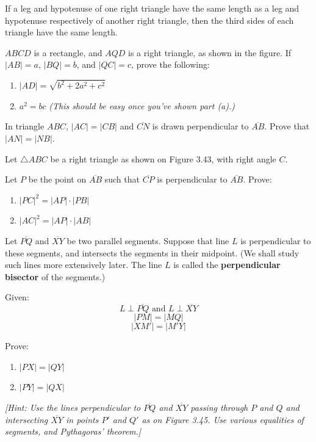 \documentclass[12pt]{book} %
\begin{document}
\begin{ExerciseList}
If a leg and hypotenuse of one right triangle have the same length as a leg and hypotenuse respectively of another right triangle, then the third sides of each triangle have the same length.

\Exercise $ABCD$ is a rectangle, and $AQD$ is a right triangle, as shown in the figure. If $|AB|=a$, $|BQ|=b$, and $|QC|=c$, prove the following:
\begin{enumerate}
\item[(a)] $|AD|=\sqrt{b^2+2a^2+c^2}$
\item[(b)] $a^2=bc$ \textit{(This should be easy once you've shown part (a).)}
\end{enumerate}


\Exercise In triangle $ABC$, $|AC|=|CB|$ and $\overline{CN}$ is drawn perpendicular to $\overline{AB}$. Prove that $|AN|=|NB|$.


\Exercise Let $\triangle ABC$ be a right triangle as shown on Figure 3.43, with right angle $C$.


Let $P$ be the point on $\overline{AB}$ such that $\overline{CP}$ is perpendicular to $\overline{AB}$. Prove:
\begin{enumerate}
\item[(a)] $|PC|^2=|AP|\cdot|PB|$
\item[(b)] $|AC|^2=|AP|\cdot|AB|$
\end{enumerate}

\Exercise Let $\overline{PQ}$ and $\overline{XY}$ be two parallel segments. Suppose that line $L$ is perpendicular to these segments, and intersects the segments in their midpoint. (We shall study such lines more extensively later. The line $L$ is called the \textbf{perpendicular bisector} of the segments.)

Given:
\[
L\perp \overline{PQ}\text{ and }L\perp \overline{XY}
\]
\[
|PM|=|MQ|
\]
\[
|XM'|=|M'Y|
\]

Prove:
\begin{enumerate}
\item[(a)] $|PX|=|QY|$
\item[(b)] $|PY|=|QX|$
\end{enumerate}


\textit{[Hint: Use the lines perpendicular to $\overline{PQ}$ and $\overline{XY}$ passing through $P$ and $Q$ and intersecting $\overline{XY}$ in points $P'$ and $Q'$ as on Figure 3.45. Use various equalities of segments, and Pythagoras' theorem.]}


\end{ExerciseList}
\end{document}
